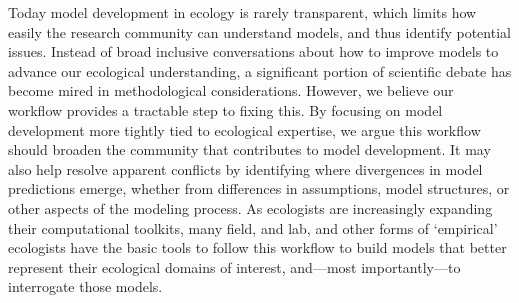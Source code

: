 \documentclass[11pt]{article}
\begin{document}
Today model development in ecology is rarely transparent, which limits how easily the research community can understand models, and thus identify potential issues. Instead of broad inclusive conversations about how to improve models to advance our ecological understanding, a significant portion of scientific debate has become mired in methodological considerations. However, we believe our workflow provides a tractable step to fixing this. By focusing on model development more tightly tied to ecological expertise, we argue this workflow should broaden the community that contributes to model development. It may also help resolve apparent conflicts by identifying where divergences in model predictions emerge, whether from differences in assumptions, model structures, or other aspects of the modeling process.
As ecologists are increasingly expanding their computational toolkits, many field, and lab, and other forms of `empirical' ecologists have the basic tools to follow this workflow to build models that better represent their ecological domains of interest, and---most importantly---to interrogate those models.


\clearpage

\end{document}
